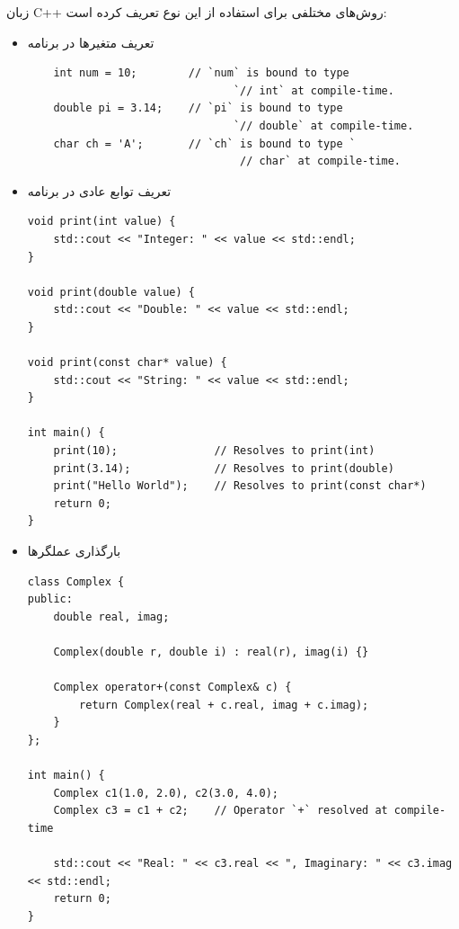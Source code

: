 \documentclass{article}
\begin{document}
زبان C++ روش‌های مختلفی برای استفاده از این نوع تعریف کرده است:
\begin{itemize}
    \item تعریف متغیر‌ها در برنامه
    \begin{LTR} %
	\begin{lstlisting}
    int num = 10;        // `num` is bound to type 
    							`// int` at compile-time.
    double pi = 3.14;    // `pi` is bound to type 
    							`// double` at compile-time.
    char ch = 'A';       // `ch` is bound to type `
    							 // char` at compile-time.
	\end{lstlisting}
	\end{LTR}


    \item تعریف توابع عادی در برنامه
    \begin{LTR} %
	\begin{lstlisting}
void print(int value) {
    std::cout << "Integer: " << value << std::endl;
}

void print(double value) {
    std::cout << "Double: " << value << std::endl;
}

void print(const char* value) {
    std::cout << "String: " << value << std::endl;
}

int main() {
    print(10);               // Resolves to print(int)
    print(3.14);             // Resolves to print(double)
    print("Hello World");    // Resolves to print(const char*)
    return 0;
}
	\end{lstlisting}
	\end{LTR}

 
    \item بارگذاری عملگرها
    \begin{LTR} %
	\begin{lstlisting}
class Complex {
public:
    double real, imag;

    Complex(double r, double i) : real(r), imag(i) {}

    Complex operator+(const Complex& c) {
        return Complex(real + c.real, imag + c.imag);
    }
};

int main() {
    Complex c1(1.0, 2.0), c2(3.0, 4.0);
    Complex c3 = c1 + c2;    // Operator `+` resolved at compile-time

    std::cout << "Real: " << c3.real << ", Imaginary: " << c3.imag << std::endl;
    return 0;
}

	\end{lstlisting}
	\end{LTR}



\end{itemize}
\end{document}
